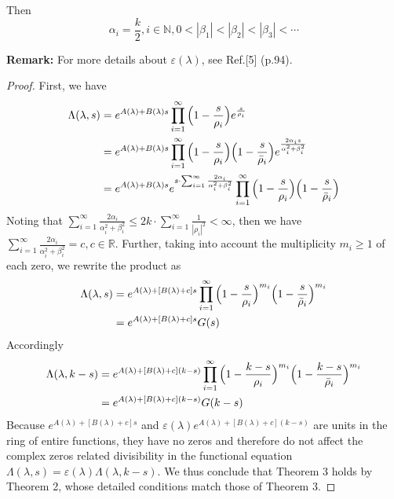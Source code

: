 \documentclass[12pt]{article}
\begin{document}
Then
\begin{equation}
 \alpha_i=\frac{k}{2}, i\in\mathbb{N}, 0<|\beta_1|<|\beta_2|<|\beta_3|<\cdots
\end{equation}

\textbf{Remark:} For more details about $\varepsilon(\lambda)$, see Ref.[5] (p.94).

\begin{proof}
First, we have
\begin{equation}\begin{split}
\Lambda(\lambda, s)&=e^{A(\lambda)+B(\lambda)s}\prod_{i=1}^{\infty}\Big{(}1-\frac{s}{\rho_i}\Big{)}e^{\frac{s}{\rho_i}}\\
&=e^{A(\lambda)+B(\lambda)s}\prod_{i=1}^{\infty}\Big{(}1-\frac{s}{\rho_i}\Big{)}\Big{(}1-\frac{s}{\bar{\rho}_i}\Big{)}e^{\frac{2\alpha_i s}{\alpha_i^2+\beta_i^2}}\\
&=e^{A(\lambda)+B(\lambda)s}e^{s\cdot\sum_{i=1}^{\infty}\frac{2\alpha_i}{\alpha_i^2+\beta_i^2}}\prod_{i=1}^{\infty}\Big{(}1-\frac{s}{\rho_i}\Big{)}\Big{(}1-\frac{s}{\bar{\rho}_i}\Big{)}\\
\end{split}\end{equation}
Noting that $\sum_{i=1}^{\infty}\frac{2\alpha_i}{\alpha_i^2+\beta_i^2}\leq 2k\cdot\sum_{i=1}^{\infty}\frac{1}{|\rho_i|^2}<\infty$, then we have $\sum_{i=1}^{\infty}\frac{2\alpha_i}{\alpha_i^2+\beta_i^2}=c, c\in \mathbb{R}$.
Further, taking into account the multiplicity $m_i\geq 1$ of each zero, we rewrite the product as
\begin{equation}\begin{split}
\Lambda(\lambda, s) &=e^{A(\lambda)+[B(\lambda)+c]s}\prod_{i=1}^{\infty}\Big{(}1-\frac{s}{\rho_i}\Big{)}^{m_i}\Big{(}1-\frac{s}{\bar{\rho}_i}\Big{)}^{m_i}\\
&=e^{A(\lambda)+[B(\lambda)+c]s} G(s)
\end{split}\end{equation}
Accordingly
\begin{equation}\begin{split}
\Lambda(\lambda,k-s) &=e^{A(\lambda)+[B(\lambda)+c](k-s)}\prod_{i=1}^{\infty}\Big{(}1-\frac{k-s}{\rho_i}\Big{)}^{m_i}\Big{(}1-\frac{k-s}{\bar{\rho}_i}\Big{)}^{m_i}\\
&=e^{A(\lambda)+[B(\lambda)+c](k-s)} G(k-s)
\end{split}\end{equation}
 Because $e^{A(\lambda)+[B(\lambda)+c]s}$ and $\varepsilon(\lambda)e^{A(\lambda)+[B(\lambda)+c](k-s)}$ are units in the ring of entire functions, they have no zeros and therefore do not affect the complex zeros related divisibility in the functional equation $\Lambda(\lambda, s)=\varepsilon(\lambda)\Lambda(\lambda, k-s)$. We thus conclude that Theorem 3 holds by Theorem 2, whose detailed conditions match those of Theorem 3.


\end{proof}
\end{document}
